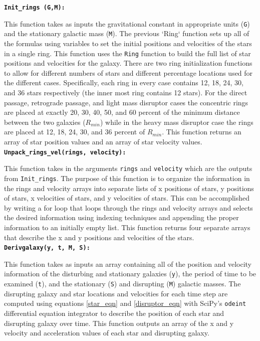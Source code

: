 \documentclass[11pt]{article}
\begin{document}
\textbf{\texttt{Init\_rings (G,M):}}

This function takes as inputs the gravitational constant in appropriate units (\texttt{G}) and the stationary galactic mass (\texttt{M}).  The previous `Ring` function sets up all of the formulas using variables to set the initial positions and velocities of the stars in a single ring.  This function uses the \texttt{Ring} function to build the full list of star positions and velocities for the galaxy.  There are two ring initialization functions to allow for different numbers of stars and different percentage locations used for the different cases.  Specifically, each ring in every case contains 12, 18, 24, 30, and 36 stars respectively (the inner most ring contains 12 stars).  For the direct passage, retrograde passage, and light mass disruptor cases the concentric rings are placed at exactly 20, 30, 40, 50, and 60 percent of the minimum distance between the two galaxies ($R_{min}$) while in the heavy mass disruptor case the rings are placed at 12, 18, 24, 30, and 36 percent of $R_{min}$.  This function returns an array of star position values and an array of star velocity values.\\

\textbf{\texttt{Unpack\_rings\_vel(rings, velocity):}}

This function takes in the arguments \texttt{rings} and \texttt{velocity} which are the outputs from \texttt{Init\_rings}.  The purpose of this function is to organize the information in the rings and velocity arrays into separate lists of x positions of stars, y positions of stars, x velocities of stars, and y velocities of stars.  This can be accomplished by writing a for loop that loops through the rings and velocity arrays and selects the desired information using indexing techniques and appending the proper information to an initially empty list.  This function returns four separate arrays that describe the x and y positions and velocities of the stars.\\

\textbf{\texttt{Derivgalaxy(y, t, M, S):}}

This function takes as inputs an array containing all of the position and velocity information of the disturbing and stationary galaxies (\texttt{y}), the period of time to be examined (\texttt{t}), and the stationary (\texttt{S}) and disrupting (\texttt{M}) galactic masses.  The disrupting galaxy and star locations and velocities for each time step are computed using equations \ref{star_eqn} and \ref{disruptor_eqn} with SciPy's \texttt{odeint} differential equation integrator to describe the position of each star and disrupting galaxy over time.  This function outputs an array of the x and y velocity and acceleration values of each star and disrupting galaxy.\\
\end{document}
